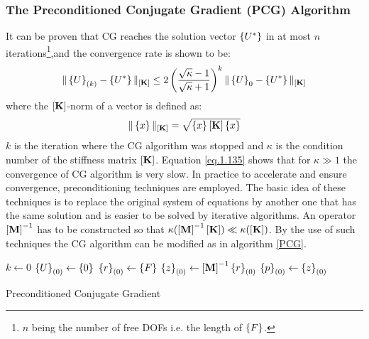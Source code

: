 \subsubsection{The Preconditioned Conjugate Gradient (PCG) Algorithm}
It can be proven \cite{saad2003iterative} that CG reaches the solution vector $\left\lbrace{U^*}\right \rbrace$ in at most $n$ iterations\footnote{$n$ being the number of free DOFs i.e. the length of $\left\lbrace{F}\right \rbrace$.},and the convergence rate is shown to be:
\begin{equation}
\label{eq.1.135}
\|\left\lbrace{U}\right \rbrace_{(k)}-\left\lbrace{U^*}\right \rbrace\|_{\left[{\mathbf{K}}\right]}\leq 2 \left(\frac{\sqrt{\kappa}-1}{\sqrt{\kappa}+1}\right)^k\|\left\lbrace{U}\right \rbrace_{0}-\left\lbrace{U^*}\right \rbrace\|_{\left[{\mathbf{K}}\right]}
\end{equation}
where the $\left[{\mathbf{K}}\right]$-norm of a vector is defined as:
\begin{equation}
\|\left\lbrace{x}\right \rbrace\|_{\left[{\mathbf{K}}\right]}=\sqrt{\left\lbrace{x}\right \rbrace\left[{\mathbf{K}}\right]\left\lbrace{x}\right \rbrace}
\end{equation}
$k$ is the iteration where the CG algorithm was stopped and $\kappa$ is the condition number of the stiffness matrix $\left[{\mathbf{K}}\right]$. Equation \ref{eq.1.135} shows that for $\kappa\gg 1$ the convergence of CG algorithm is very slow. In practice to accelerate and ensure convergence, preconditioning techniques are employed. The basic idea of these techniques is to replace the original system of equations by another one that has the same solution and is easier to be solved by iterative algorithms. An operator $\left[{\mathbf{M}}\right]^{-1}$ has to be constructed so that $\kappa(\left[{\mathbf{M}}\right]^{-1}\left[{\mathbf{K}}\right]) \ll \kappa( \left[{\mathbf{K}}\right])$.
By the use of such techniques the CG algorithm can be modified as in algorithm \ref{PCG}.
\begin{algorithm}[ht!]

$k\gets 0$\;
$\left\lbrace{U}\right \rbrace_{(0)}\gets\left\lbrace{0}\right \rbrace$\;
$\left\lbrace{r}\right \rbrace_{(0)}\gets \left\lbrace{F}\right \rbrace$\;
$\left\lbrace{z}\right \rbrace_{(0)}\gets \left[{\mathbf{M}}\right]^{-1} \left\lbrace{r}\right \rbrace_{(0)}$\;
$\left\lbrace{p}\right \rbrace_{(0)}\gets \left\lbrace{z}\right \rbrace_{(0)}$\;
 \caption{Preconditioned Conjugate Gradient \label{PCG}}
\end{algorithm}
